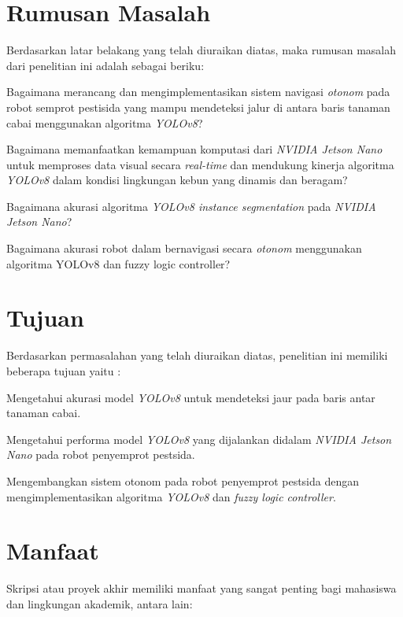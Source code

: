 \section{Rumusan Masalah}
Berdasarkan latar belakang yang telah diuraikan diatas, maka rumusan
masalah dari penelitian ini adalah sebagai beriku:
\begin{packed_enum}
	\item Bagaimana merancang dan mengimplementasikan sistem navigasi \textit{otonom} pada robot semprot pestisida yang mampu mendeteksi jalur di antara baris tanaman cabai menggunakan algoritma \textit{YOLOv8}?
	\item Bagaimana memanfaatkan kemampuan komputasi dari \textit{NVIDIA Jetson Nano} untuk memproses data visual secara \textit{real-time} dan mendukung kinerja algoritma \textit{YOLOv8} dalam kondisi lingkungan kebun yang dinamis dan beragam?
	\item Bagaimana akurasi  algoritma \textit{YOLOv8 instance segmentation} pada \textit{NVIDIA Jetson Nano}?
	\item Bagaimana akurasi robot dalam bernavigasi secara \textit{otonom} menggunakan algoritma YOLOv8 dan  fuzzy logic controller? 
\end{packed_enum}

\section{Tujuan}
Berdasarkan permasalahan yang telah diuraikan diatas, penelitian ini
memiliki beberapa tujuan yaitu :
\begin{packed_enum}
	\item Mengetahui akurasi model \textit{YOLOv8} untuk mendeteksi jaur pada  baris antar tanaman cabai.
	\item Mengetahui performa  model \textit{YOLOv8} yang dijalankan didalam \textit{NVIDIA Jetson Nano} pada robot penyemprot pestsida.
	\item Mengembangkan sistem otonom pada robot penyemprot pestsida dengan mengimplementasikan algoritma \textit{YOLOv8} dan \textit{fuzzy logic controller}.
\end{packed_enum}

\section{Manfaat}
Skripsi atau proyek akhir memiliki manfaat yang sangat penting bagi mahasiswa dan lingkungan akademik, antara lain:

